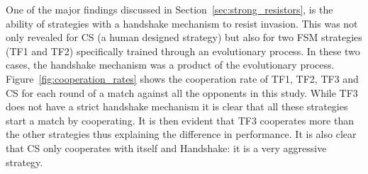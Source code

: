 \documentclass{article}
\begin{document}
One of the major findings discussed in Section~\ref{sec:strong_resistors}, is
the ability of strategies with a handshake mechanism to resist invasion. This
was not only revealed for CS (a human designed strategy) but also for
two FSM strategies (TF1 and TF2) specifically trained through an evolutionary
process. In these two cases, the handshake mechanism was a product of the
evolutionary process. Figure~\ref{fig:cooperation_rates} shows the cooperation
rate of TF1, TF2, TF3 and CS
for each round of a match against all the opponents in this study. While TF3
does not have a strict handshake mechanism it is clear that all these strategies
start a match by cooperating. It is then evident that TF3 cooperates more than
the other strategies thus explaining the difference in performance. It is also
clear that CS only cooperates with itself and Handshake: it is a very aggressive
strategy.
\end{document}
